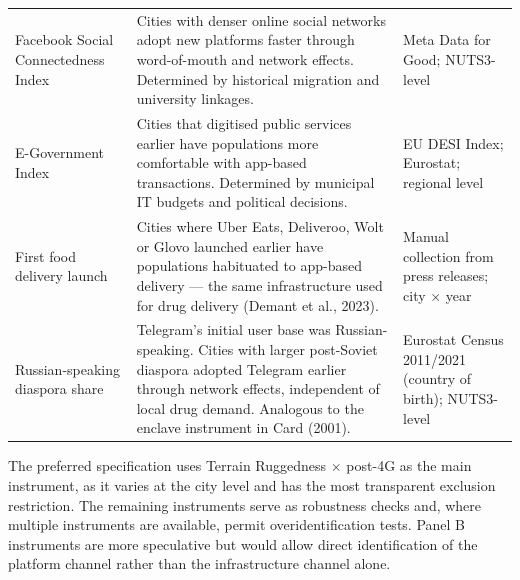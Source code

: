 \documentclass[12pt, a4paper]{article}
\begin{document}
\begin{table}[H]
\begin{tabular}{p{3.2cm} p{6.5cm} p{3.8cm}}
Facebook Social Connectedness Index & 
Cities with denser online social networks 
adopt new platforms faster through 
word-of-mouth and network effects. 
Determined by historical migration and 
university linkages. & 
Meta Data for Good; NUTS3-level \\[6pt]

E-Government Index & 
Cities that digitised public services earlier 
have populations more comfortable with 
app-based transactions. Determined by 
municipal IT budgets and political decisions. & 
EU DESI Index; Eurostat; regional level \\[6pt]

First food delivery launch & 
Cities where Uber Eats, Deliveroo, Wolt or 
Glovo launched earlier have populations 
habituated to app-based delivery --- the same 
infrastructure used for drug delivery 
(Demant et al., 2023). & 
Manual collection from press releases; 
city $\times$ year \\[6pt]

Russian-speaking diaspora share & 
Telegram's initial user base was 
Russian-speaking. Cities with larger 
post-Soviet diaspora adopted Telegram 
earlier through network effects, independent 
of local drug demand. Analogous to the 
enclave instrument in Card (2001). & 
Eurostat Census 2011/2021 (country of 
birth); NUTS3-level \\[6pt]

\hline\hline
\end{tabular}
\end{table}

\noindent The preferred specification uses Terrain 
Ruggedness $\times$ post-4G as the main instrument, as it 
varies at the city level and has the most transparent 
exclusion restriction. The remaining instruments serve as 
robustness checks and, where multiple instruments are 
available, permit overidentification tests. Panel B 
instruments are more speculative but would allow direct 
identification of the platform channel rather than the 
infrastructure channel alone.
\end{document}
